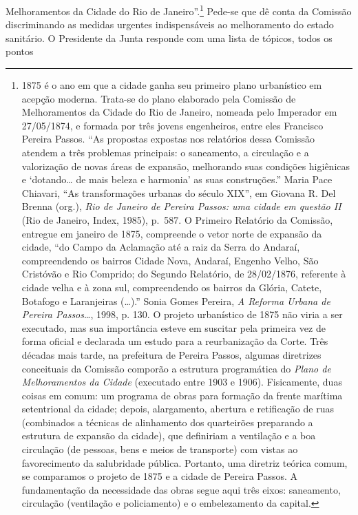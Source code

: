 Melhoramentos da Cidade do Rio de Janeiro''.\footnote{1875 é o ano em
  que a cidade ganha seu primeiro plano urbanístico em acepção moderna.
  Trata-se do plano elaborado pela Comissão de Melhoramentos da Cidade
  do Rio de Janeiro, nomeada pelo Imperador em 27/05/1874, e formada por
  três jovens engenheiros, entre eles Francisco Pereira Passos. ``As
  propostas expostas nos relatórios dessa Comissão atendem a três
  problemas principais: o saneamento, a circulação e a valorização de
  novas áreas de expansão, melhorando suas condições higiênicas e
  `dotando\dots{} de mais beleza e harmonia' as suas construções.'' Maria
  Pace Chiavari, ``As transformações urbanas do século XIX'', em Giovana
  R. Del Brenna (org.), \textit{Rio de Janeiro de Pereira Passos: uma
  cidade em questão II} (Rio de Janeiro, Index, 1985), p.~587. O
  Primeiro Relatório da Comissão, entregue em janeiro de 1875,
  compreende o vetor norte de expansão da cidade, ``do Campo da
  Aclamação até a raiz da Serra do Andaraí, compreendendo os bairros
  Cidade Nova, Andaraí, Engenho Velho, São Cristóvão e Rio Comprido; do
  Segundo Relatório, de 28/02/1876, referente à cidade velha e à zona
  sul, compreendendo os bairros da Glória, Catete, Botafogo e
  Laranjeiras (\dots{}).'' Sonia Gomes Pereira, \textit{A Reforma Urbana de
  Pereira Passos}\ldots{}, 1998, p. 130. O projeto urbanístico de 1875
  não viria a ser executado, mas sua importância esteve em suscitar pela
  primeira vez de forma oficial e declarada um estudo para a
  reurbanização da Corte. Três décadas mais tarde, na prefeitura de
  Pereira Passos, algumas diretrizes conceituais da Comissão comporão a
  estrutura programática do \textit{Plano de Melhoramentos da Cidade}
  (executado entre 1903 e 1906). Fisicamente, duas coisas em comum: um
  programa de obras para formação da frente marítima setentrional da
  cidade; depois, alargamento, abertura e retificação de ruas
  (combinados a técnicas de alinhamento dos quarteirões preparando a
  estrutura de expansão da cidade), que definiriam a ventilação e a boa
  circulação (de pessoas, bens e meios de transporte) com vistas ao
  favorecimento da salubridade pública. Portanto, uma diretriz teórica
  comum, se comparamos o projeto de 1875 e a cidade de Pereira Passos. A
  fundamentação da necessidade das obras segue aqui três eixos:
  saneamento, circulação (ventilação e policiamento) e o embelezamento
  da capital.} Pede-se que dê conta da Comissão discriminando as medidas
urgentes indispensáveis ao melhoramento do estado sanitário. O
Presidente da Junta responde com uma lista de tópicos, todos os pontos
